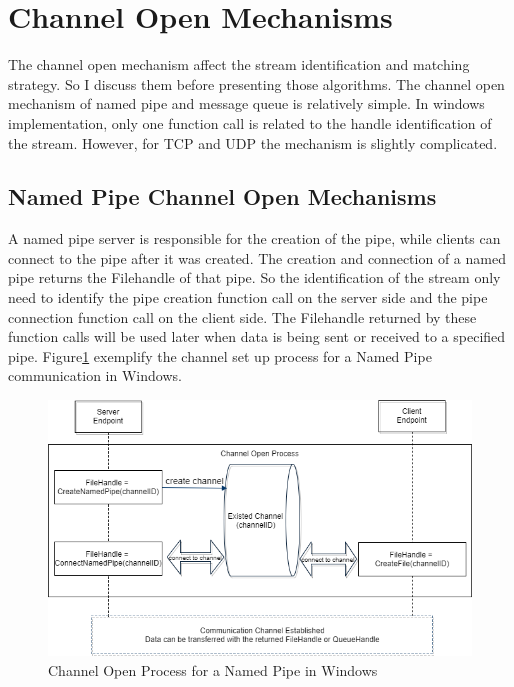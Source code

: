 \section{Channel Open Mechanisms}
The channel open mechanism affect the stream identification and matching strategy. So I discuss them before presenting those algorithms. The channel open mechanism of named pipe and message queue is relatively simple. In windows implementation, only one function call is related to the handle identification of the stream. However, for TCP and UDP the mechanism is slightly complicated.

\subsection{Named Pipe Channel Open Mechanisms} 
A named pipe server is responsible for the creation of the pipe, while clients can connect to the pipe after it was created. The creation and connection of a named pipe returns the Filehandle of that pipe. So the identification of the stream only need to identify the pipe creation function call on the server side and the pipe connection function call on the client side. The Filehandle returned by these function calls will be used later when data is being sent or received to a specified pipe. Figure\ref{namedpipeopen} exemplify the channel set up process for a Named Pipe communication in Windows. 

\begin{figure}[H]
\centerline{\includegraphics[scale=0.45]{Figures/namepipechannelopen}}
 \caption{Channel Open Process for a Named Pipe in Windows}
\label{namedpipeopen}
\end{figure}
    
